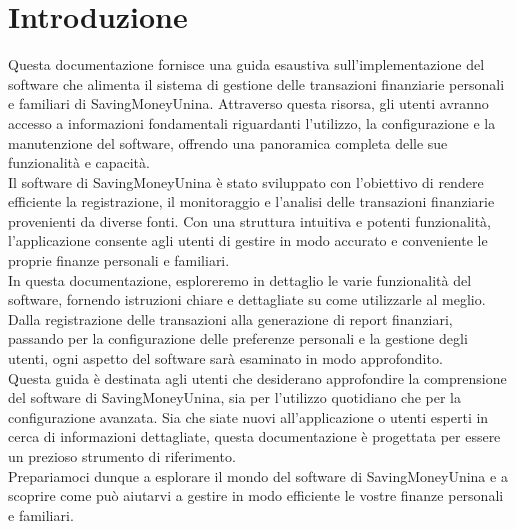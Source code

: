 \chapter{Introduzione}

Questa documentazione fornisce una guida esaustiva sull'implementazione
del software che alimenta il sistema di gestione delle transazioni finanziarie
personali e familiari di SavingMoneyUnina. Attraverso questa risorsa,
gli utenti avranno accesso a informazioni fondamentali riguardanti l'utilizzo,
la configurazione e la manutenzione del software,
offrendo una panoramica completa delle sue funzionalità e capacità.\\

Il software di SavingMoneyUnina è stato sviluppato con l'obiettivo di
rendere efficiente la registrazione, il monitoraggio e l'analisi delle
transazioni finanziarie provenienti da diverse fonti. Con una struttura
intuitiva e potenti funzionalità, l'applicazione consente agli utenti di
gestire in modo accurato e conveniente le proprie finanze personali e familiari.\\

In questa documentazione, esploreremo in dettaglio le varie funzionalità
del software, fornendo istruzioni chiare e dettagliate su come utilizzarle
al meglio. Dalla registrazione delle transazioni alla generazione di report
finanziari, passando per la configurazione delle preferenze personali e la
gestione degli utenti, ogni aspetto del software sarà esaminato in modo approfondito.\\

Questa guida è destinata agli utenti che desiderano approfondire la comprensione
del software di SavingMoneyUnina, sia per l'utilizzo quotidiano che per la
configurazione avanzata. Sia che siate nuovi all'applicazione o utenti esperti
in cerca di informazioni dettagliate, questa documentazione è progettata per
essere un prezioso strumento di riferimento.\\

Prepariamoci dunque a esplorare il mondo del software di SavingMoneyUnina
e a scoprire come può aiutarvi a gestire in modo efficiente le vostre finanze personali e familiari.